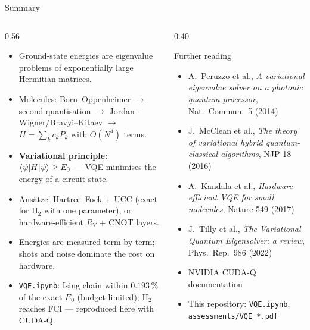 \documentclass[aspectratio=169,11pt]{beamer}
\newcommand{\key}[1]{{\color{qdark}\textbf{#1}}}
\begin{document}
\begin{frame}{Summary}
  \begin{columns}[T]
    \begin{column}{0.56\textwidth}
      \footnotesize
      \begin{itemize}\itemsep1pt
        \item Ground-state energies are eigenvalue problems of exponentially large Hermitian matrices.
        \item Molecules: Born--Oppenheimer $\to$ second quantisation $\to$ Jordan--Wigner/Bravyi--Kitaev $\to$ $H = \sum_kc_kP_k$ with $O(N^4)$ terms.
        \item \key{Variational principle}: $\braket{\psi|H|\psi} \ge E_0$ --- VQE minimises the energy of a circuit state.
        \item Ansätze: Hartree--Fock + UCC (exact for H$_2$ with one parameter), or hardware-efficient $R_Y$ + CNOT layers.
        \item Energies are measured term by term; shots and noise dominate the cost on hardware.
        \item \texttt{VQE.ipynb}: Ising chain within $0.193\,\%$ of the exact $E_0$ (budget-limited); H$_2$ reaches FCI --- reproduced here with CUDA-Q.
      \end{itemize}
    \end{column}
    \begin{column}{0.40\textwidth}
      \begin{block}{Further reading}
        \scriptsize
        \begin{itemize}\itemsep0pt
          \item A.\ Peruzzo et al., \emph{A variational eigenvalue solver on a photonic quantum processor}, Nat.\ Commun.\ 5 (2014)
          \item J.\ McClean et al., \emph{The theory of variational hybrid quantum-classical algorithms}, NJP 18 (2016)
          \item A.\ Kandala et al., \emph{Hardware-efficient VQE for small molecules}, Nature 549 (2017)
          \item J.\ Tilly et al., \emph{The Variational Quantum Eigensolver: a review}, Phys.\ Rep.\ 986 (2022)
          \item NVIDIA CUDA-Q documentation
          \item This repository: \texttt{VQE.ipynb}, \texttt{assessments/VQE\_*.pdf}
        \end{itemize}
      \end{block}
    \end{column}
  \end{columns}
\end{frame}
\end{document}

